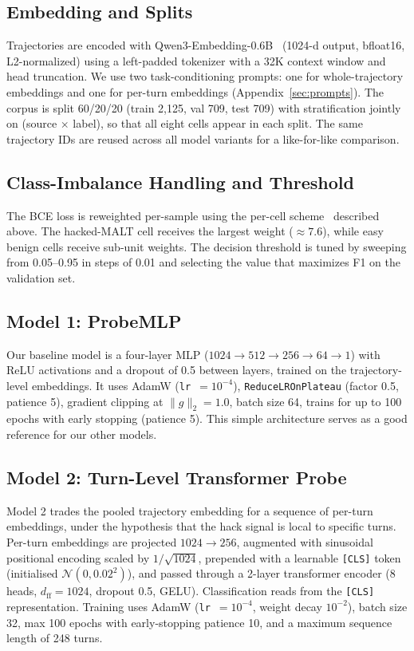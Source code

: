 \documentclass{article}
\begin{document}
\subsection{Embedding and Splits}

Trajectories are encoded with Qwen3-Embedding-0.6B~\cite{qwen3embedding} (1024-d output, bfloat16, L2-normalized) using a left-padded tokenizer with a 32K context window and head truncation. We use two task-conditioning prompts: one for whole-trajectory embeddings and one for per-turn embeddings (Appendix~\ref{sec:prompts}). The corpus is split 60/20/20 (train 2{,}125, val 709, test 709) with stratification jointly on (source $\times$ label), so that all eight cells appear in each split. The same trajectory IDs are reused across all model variants for a like-for-like comparison.

\subsection{Class-Imbalance Handling and Threshold}

The BCE loss is reweighted per-sample using the per-cell scheme~\cite{ai-assist} described above. The hacked-MALT cell receives the largest weight ($\approx 7.6$), while easy benign cells receive sub-unit weights. The decision threshold is tuned by sweeping from 0.05--0.95 in steps of 0.01 and selecting the value that maximizes F1 on the validation set.

\subsection{Model 1: ProbeMLP}

Our baseline model is a four-layer MLP ($1024 \to 512 \to 256 \to 64 \to 1$) with ReLU activations and a dropout of 0.5 between layers, trained on the trajectory-level embeddings. It uses AdamW (\texttt{lr}~$=10^{-4}$), \texttt{ReduceLROnPlateau} (factor 0.5, patience 5), gradient clipping at $\lVert g \rVert_2 = 1.0$, batch size 64, trains for up to 100 epochs with early stopping (patience 5). This simple architecture serves as a good reference for our other models.

\subsection{Model 2: Turn-Level Transformer Probe}

Model 2 trades the pooled trajectory embedding for a sequence of per-turn embeddings, under the hypothesis that the hack signal is local to specific turns. Per-turn embeddings are projected $1024 \to 256$, augmented with sinusoidal positional encoding scaled by $1/\sqrt{1024}$, prepended with a learnable \texttt{[CLS]} token (initialised $\mathcal{N}(0, 0.02^2)$), and passed through a 2-layer transformer encoder (8 heads, $d_{\text{ff}} = 1024$, dropout 0.5, GELU). Classification reads from the \texttt{[CLS]} representation. Training uses AdamW (\texttt{lr}~$=10^{-4}$, weight decay $10^{-2}$), batch size 32, max 100 epochs with early-stopping patience 10, and a maximum sequence length of 248 turns.
\end{document}
